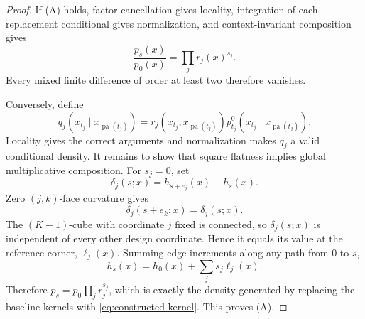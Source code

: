 \documentclass[11pt]{article}
\newcommand{\pa}{\operatorname{pa}}
\begin{document}
\begin{proof}
If (A) holds, factor cancellation gives locality, integration of each replacement conditional gives normalization, and context-invariant composition gives
\begin{equation}
\frac{p_s(x)}{p_0(x)}=\prod_j r_j(x)^{s_j}.
\end{equation}
Every mixed finite difference of order at least two therefore vanishes.

Conversely, define
\begin{equation}
q_j(x_{t_j}\mid x_{\pa(t_j)})
=
r_j(x_{t_j},x_{\pa(t_j)})p_{t_j}^0(x_{t_j}\mid x_{\pa(t_j)}).
\label{eq:constructed-kernel}
\end{equation}
Locality gives the correct arguments and normalization makes \(q_j\) a valid conditional density.  It remains to show that square flatness implies global multiplicative composition.  For \(s_j=0\), set
\begin{equation}
\delta_j(s;x)=h_{s+e_j}(x)-h_s(x).
\end{equation}
Zero \((j,k)\)-face curvature gives
\begin{equation}
\delta_j(s+e_k;x)=\delta_j(s;x).
\end{equation}
The \((K-1)\)-cube with coordinate \(j\) fixed is connected, so \(\delta_j(s;x)\) is independent of every other design coordinate.  Hence it equals its value at the reference corner, \(\ell_j(x)\).  Summing edge increments along any path from \(0\) to \(s\),
\begin{equation}
h_s(x)=h_0(x)+\sum_j s_j\ell_j(x).
\end{equation}
Therefore \(p_s=p_0\prod_jr_j^{s_j}\), which is exactly the density generated by replacing the baseline kernels with \eqref{eq:constructed-kernel}.  This proves (A).
\end{proof}
\end{document}
